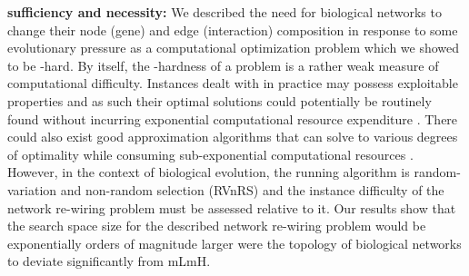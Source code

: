 \textbf{sufficiency and necessity:} We described the need for biological networks to change their node (gene) and edge (interaction) composition in response to some evolutionary pressure as a computational optimization problem which we showed to be -hard. By itself, the -hardness of a problem is a rather weak measure of  computational difficulty.  Instances dealt with in practice may possess exploitable properties and as such their  optimal solutions could potentially be routinely found without incurring exponential computational resource expenditure \cite{vazirani_approximation_2013}. There could also exist good approximation algorithms that can solve to various degrees of optimality while consuming sub-exponential computational resources \cite{lawler_fast_1979}. However, in the context of biological evolution, the running algorithm is random-variation and non-random selection (RVnRS) and the instance difficulty of the network re-wiring problem must be assessed relative to it. Our results show that the search space size for the described network re-wiring problem would be exponentially orders of magnitude larger were the topology of biological networks to deviate significantly from mLmH.

